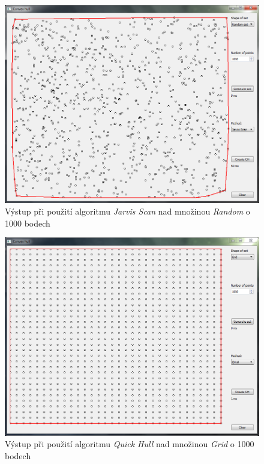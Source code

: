 \documentclass[a4paper, 12pt]{article}
\begin{document}
\begin{figure}[h!]
	\centering
	\includegraphics[width=11.5cm]{./pictures/app_random_jarvis.png}
	\caption{Výstup při použití algoritmu \textit{Jarvis Scan} nad množinou \textit{Random} o 1000 bodech}
\end{figure}

\begin{figure}[h!]
	\centering
	\includegraphics[width=13cm]{./pictures/app_raster_qhull.png}
	\caption{Výstup při použití algoritmu \textit{Quick Hull} nad množinou \textit{Grid} o 1000 bodech}
\end{figure}
~
\end{document}

